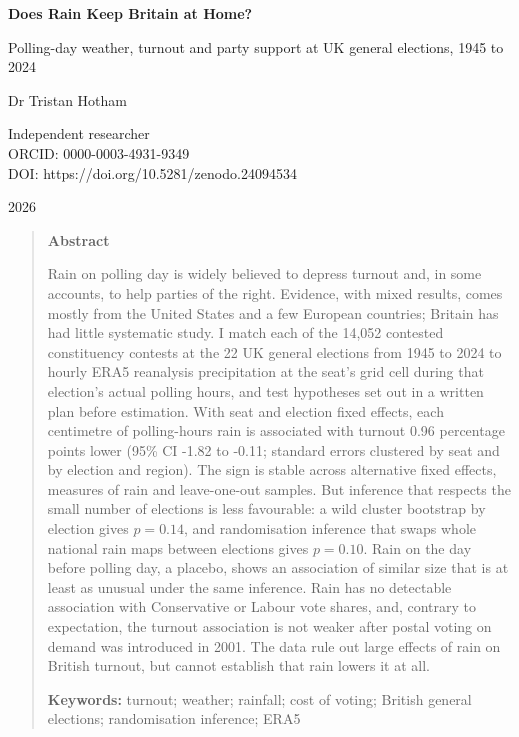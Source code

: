\documentclass[11pt,a4paper]{article}
\begin{document}
\begin{center}
{\LARGE\bfseries Does Rain Keep Britain at Home?\par}
\vspace{0.4em}
{\large Polling-day weather, turnout and party support at UK general elections, 1945 to 2024\par}
\vspace{1.2em}
{\large Dr Tristan Hotham\par}
\vspace{0.3em}
{\small Independent researcher\\
ORCID: 0000-0003-4931-9349\\
DOI: https://doi.org/10.5281/zenodo.24094534\par}
\vspace{0.8em}
2026
\end{center}

\begin{quote}
\small
\begin{center}\textbf{Abstract}\end{center}
Rain on polling day is widely believed to depress turnout and, in some accounts, to help parties of the right. Evidence, with mixed results, comes mostly from the United States and a few European countries; Britain has had little systematic study. I match each of the 14{,}052 contested constituency contests at the 22 UK general elections from 1945 to 2024 to hourly ERA5 reanalysis precipitation at the seat's grid cell during that election's actual polling hours, and test hypotheses set out in a written plan before estimation. With seat and election fixed effects, each centimetre of polling-hours rain is associated with turnout 0.96 percentage points lower (95\% CI -1.82 to -0.11; standard errors clustered by seat and by election and region). The sign is stable across alternative fixed effects, measures of rain and leave-one-out samples. But inference that respects the small number of elections is less favourable: a wild cluster bootstrap by election gives $p=0.14$, and randomisation inference that swaps whole national rain maps between elections gives $p=0.10$. Rain on the day before polling day, a placebo, shows an association of similar size that is at least as unusual under the same inference. Rain has no detectable association with Conservative or Labour vote shares, and, contrary to expectation, the turnout association is not weaker after postal voting on demand was introduced in 2001. The data rule out large effects of rain on British turnout, but cannot establish that rain lowers it at all.

\textbf{Keywords:} turnout; weather; rainfall; cost of voting; British general elections; randomisation inference; ERA5
\end{quote}
\end{document}

